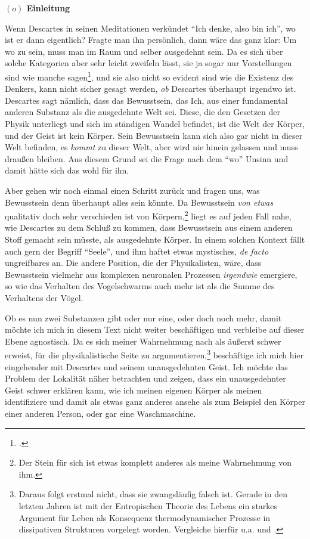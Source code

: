\documentclass[a4paper, 12pt]{article}
\begin{document}
\begin{onehalfspace} 

\noindent\textbf{$(o)$ Einleitung}

\noindent Wenn Descartes in seinen Meditationen verkündet "`Ich denke, also bin ich"', wo ist er dann eigentlich? Fragte man ihn persönlich, dann wäre das ganz klar: Um wo zu sein, muss man im Raum und selber ausgedehnt sein. Da es sich über solche Kategorien aber sehr leicht zweifeln lässt, sie ja sogar nur Vorstellungen sind wie manche sagen\footnote{\Cite[Vgl.][S. XXX]{kant}.}, und sie also nicht so evident sind wie die Existenz des Denkers, kann nicht sicher gesagt werden, \emph{ob} Descartes überhaupt irgendwo ist. Descartes sagt nämlich, dass das Bewusstsein, das Ich, aus einer fundamental anderen Substanz als die ausgedehnte Welt sei. Diese, die den Gesetzen der Physik unterliegt und sich im ständigen Wandel befindet, ist die Welt der Körper, und der Geist ist kein Körper. Sein Bewusstsein kann sich also gar nicht in dieser Welt befinden, es \emph{kommt} zu dieser Welt, aber wird nie hinein gelassen und muss draußen bleiben. Aus diesem Grund sei die Frage nach dem "`wo"' Unsinn und damit hätte sich das wohl für ihn. 

Aber gehen wir noch einmal einen Schritt zurück und fragen uns, was Bewusstsein denn überhaupt alles sein könnte. Da Bewusstsein \emph{von etwas} qualitativ doch sehr verschieden ist von Körpern,\footnote{Der Stein für sich ist etwas komplett anderes als meine Wahrnehmung von ihm.} liegt es auf jeden Fall nahe, wie Descartes zu dem Schluß zu kommen, dass Bewusstsein aus einem anderen Stoff gemacht sein müsste, als ausgedehnte Körper. In einem solchen Kontext fällt auch gern der Begriff "`Seele"', und ihm haftet etwas mystisches, \emph{de facto} ungreifbares an. Die andere Position, die der Physikalisten, wäre, dass Bewusstsein vielmehr aus komplexen neuronalen Prozessen \emph{irgendwie} emergiere, so wie das Verhalten des Vogelschwarms auch mehr ist als die Summe des Verhaltens der Vögel. 

Ob es nun zwei Substanzen gibt oder nur eine, oder doch noch mehr, damit möchte ich mich in diesem Text nicht weiter beschäftigen und verbleibe auf dieser Ebene agnostisch. Da es sich meiner Wahrnehmung nach als äußerst schwer erweist, für die physikalistische Seite zu argumentieren,\footnote{Daraus folgt erstmal nicht, dass sie zwangsläufig falsch ist. Gerade in den letzten Jahren ist mit der Entropischen Theorie des Lebens ein starkes Argument für Leben als Konsequenz thermodynamischer Prozesse in dissipativen Strukturen vorgelegt worden. Vergleiche hierfür u.a.  und .} beschäftige ich mich hier eingehender mit Descartes und seinem unausgedehnten Geist. Ich möchte das Problem der Lokalität näher betrachten und zeigen, dass ein unausgedehnter Geist schwer erklären kann, wie ich meinen eigenen Körper als meinen identifiziere und damit als etwas ganz anderes ansehe als zum Beispiel den Körper einer anderen Person, oder gar eine Waschmaschine.


\end{onehalfspace}
\end{document}
